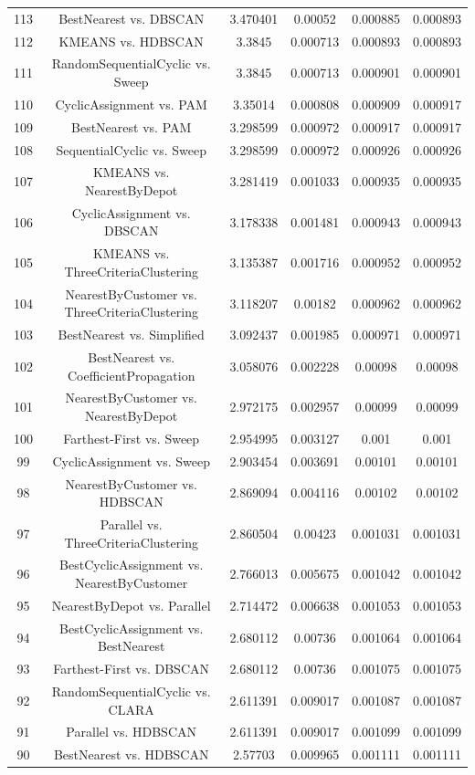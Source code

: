 \documentclass[a4paper,10pt]{article}
\begin{document}
\begin{landscape}
\begin{table}[!htp]
\begin{tabular}{cccccc}
113&BestNearest vs. DBSCAN&3.470401&0.00052&0.000885&0.000893\\
112&KMEANS vs. HDBSCAN&3.3845&0.000713&0.000893&0.000893\\
111&RandomSequentialCyclic vs. Sweep&3.3845&0.000713&0.000901&0.000901\\
110&CyclicAssignment vs. PAM&3.35014&0.000808&0.000909&0.000917\\
109&BestNearest vs. PAM&3.298599&0.000972&0.000917&0.000917\\
108&SequentialCyclic vs. Sweep&3.298599&0.000972&0.000926&0.000926\\
107&KMEANS vs. NearestByDepot&3.281419&0.001033&0.000935&0.000935\\
106&CyclicAssignment vs. DBSCAN&3.178338&0.001481&0.000943&0.000943\\
105&KMEANS vs. ThreeCriteriaClustering&3.135387&0.001716&0.000952&0.000952\\
104&NearestByCustomer vs. ThreeCriteriaClustering&3.118207&0.00182&0.000962&0.000962\\
103&BestNearest vs. Simplified&3.092437&0.001985&0.000971&0.000971\\
102&BestNearest vs. CoefficientPropagation&3.058076&0.002228&0.00098&0.00098\\
101&NearestByCustomer vs. NearestByDepot&2.972175&0.002957&0.00099&0.00099\\
100&Farthest-First vs. Sweep&2.954995&0.003127&0.001&0.001\\
99&CyclicAssignment vs. Sweep&2.903454&0.003691&0.00101&0.00101\\
98&NearestByCustomer vs. HDBSCAN&2.869094&0.004116&0.00102&0.00102\\
97&Parallel vs. ThreeCriteriaClustering&2.860504&0.00423&0.001031&0.001031\\
96&BestCyclicAssignment vs. NearestByCustomer&2.766013&0.005675&0.001042&0.001042\\
95&NearestByDepot vs. Parallel&2.714472&0.006638&0.001053&0.001053\\
94&BestCyclicAssignment vs. BestNearest&2.680112&0.00736&0.001064&0.001064\\
93&Farthest-First vs. DBSCAN&2.680112&0.00736&0.001075&0.001075\\
92&RandomSequentialCyclic vs. CLARA&2.611391&0.009017&0.001087&0.001087\\
91&Parallel vs. HDBSCAN&2.611391&0.009017&0.001099&0.001099\\
90&BestNearest vs. HDBSCAN&2.57703&0.009965&0.001111&0.001111\\

\end{tabular}
\end{table}
\end{landscape}
\end{document}
